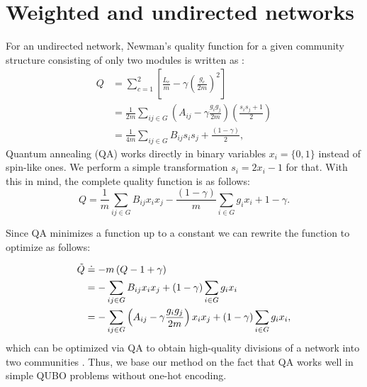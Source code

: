 \documentclass[pdflatex,sn-mathphys-num]{sn-jnl}%
\begin{document}
\setcounter{figure}{0}
\renewcommand{\thefigure}{S\arabic{figure}}
\setcounter{equation}{0}
\renewcommand{\theequation}{S1.\arabic{equation}}
\setcounter{section}{0}
\renewcommand{\thesection}{S\arabic{section}}

\section{Weighted and undirected networks} \label{app:A}
For an undirected network, Newman's quality function for a given community structure consisting of only two modules is written as \cite{Wierzbinski2023}:
\begin{equation} \label{eq_A:ising}
    \begin{split}
        Q & = \sum_{c=1}^{2}\left[ \frac{L_c}{m} - \gamma \left(\frac{g_c}{2m}\right)^2\right] \\
          & = \frac{1}{2m} \sum_{ij\in G}\left( A_{ij} - \gamma \frac{g_i g_j}{2m} \right) \left(\frac{s_i s_j + 1}{2}\right)\\
          & = \frac{1}{4m} \sum_{ij\in G} B_{ij} s_i s_j + \frac{(1-\gamma)}{2},
    \end{split}
\end{equation} Quantum annealing (QA) works directly in binary variables $x_i=\{0,1\}$ instead of spin-like ones. We perform a simple transformation $s_i = 2x_i - 1$ for that. With this in mind, the complete quality function is as follows:
\begin{equation} \label{eq_A:QUBO}
    Q = \frac{1}{m}\sum_{ij\in G} B_{ij} x_i x_j - \frac{(1-\gamma)}{m}\sum_{i\in G} g_{i} x_i + 1-\gamma.
\end{equation}

Since QA minimizes a function up to a constant we can rewrite the function to optimize as follows:

\begin{equation} \label{eq_A:QUBO_optim}
    \begin{split}
        \Tilde{Q} & \doteq - m \left(Q - 1 + \gamma \right) \\
                  & = -\sum_{ij\in G} B_{ij} x_i x_j + (1-\gamma)\sum_{i\in G} g_{i} x_i \\
                  & = -\sum_{ij\in G} \left( A_{ij} - \gamma \frac{g_i g_j}{2m} \right) x_i x_j + (1-\gamma)\sum_{i\in G} g_{i} x_i,
    \end{split}
\end{equation} which can be optimized via QA to obtain high-quality divisions of a network into two communities \cite{Ushijima-Mwesigwa2017,Negre2020,Nembrini2022,Wierzbinski2023}. Thus, we base our method on the fact that QA works well in simple QUBO problems without one-hot encoding.
\end{document}
